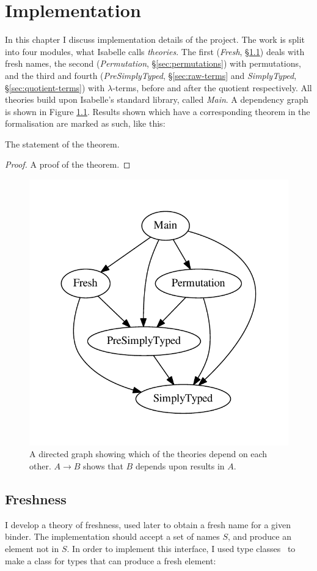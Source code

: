 \chapter{Implementation}
In this chapter I discuss implementation details of the project.
The work is split into four modules, what Isabelle calls \emph{theories}.
The first (\emph{Fresh}, \S\ref{sec:freshness}) deals with fresh names, the second (\emph{Permutation}, \S\ref{sec:permutations}) with permutations, and the third and fourth (\emph{PreSimplyTyped}, \S\ref{sec:raw-terms} and \emph{SimplyTyped}, \S\ref{sec:quotient-terms}) with \(\lambda\)-terms, before and after the quotient respectively.
All theories build upon Isabelle's standard library, called \emph{Main}.
A dependency graph is shown in Figure \ref{fig:dependencies}.
Results shown which have a corresponding theorem in the formalisation are marked as such, like this:
\setcounter{theorem}{-1}
\begin{theorem}
The statement of the theorem.
\end{theorem}
\begin{proof}
A proof of the theorem.
\end{proof}

\begin{figure}
\centering
\includegraphics[width=.5\textwidth]{chapters/implementation/figures/dependencies}
\caption{A directed graph showing which of the theories depend on each other. \(A \to B\) shows that \(B\) depends upon results in \(A\).}
\label{fig:dependencies}
\end{figure}

\section{Freshness}
\label{sec:freshness}
I develop a theory of freshness, used later to obtain a fresh name for a given binder.
The implementation should accept a set of names \(S\), and produce an element not in \(S\).
In order to implement this interface, I used type classes~\cite{isabelle-typeclasses} to make a class for types that can produce a fresh element:

